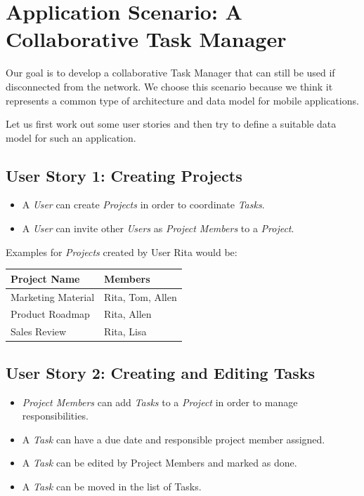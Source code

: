 
\section{Application Scenario: A Collaborative Task Manager}
Our goal is to develop a collaborative Task Manager that can still be used if disconnected from the network.
We choose this scenario because we think it represents a common type of architecture and data model for mobile applications.

Let us first work out some user stories and then try to define a suitable data model for such an application.

\subsection{User Story 1: Creating Projects}
\begin{itemize}
\item A \emph{User} can create \emph{Projects} in order to coordinate \emph{Tasks}.
\item A \emph{User} can invite other \emph{Users} as \emph{Project Members} to a \emph{Project}.
\end{itemize}

Examples for \emph{Projects} created by User Rita would be:\\

\begin{tabular}{ l l }
Project Name & Members \\
\hline
Marketing Material & Rita, Tom, Allen \\
Product Roadmap & Rita, Allen \\
Sales Review & Rita, Lisa
\end{tabular}

\subsection{User Story 2: Creating and Editing Tasks}
\begin{itemize}
\item \emph{Project Members} can add \emph{Tasks} to a \emph{Project} in order to manage responsibilities.
\item A \emph{Task} can have a due date and responsible project member assigned.
\item A \emph{Task} can be edited by Project Members and marked as done.
\item A \emph{Task} can be moved in the list of Tasks.
\end{itemize}


